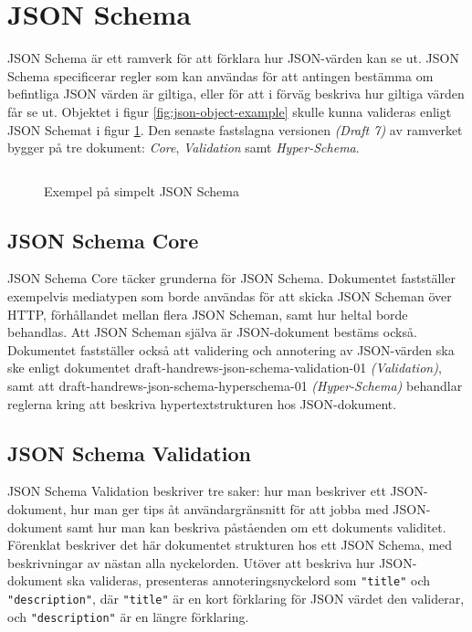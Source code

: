 \section{JSON Schema}
\label{sec:teori:schema}
JSON Schema är ett ramverk för att förklara hur JSON-värden kan se ut. JSON Schema specificerar regler som kan användas för att antingen bestämma om befintliga JSON värden är giltiga, eller för att i förväg beskriva hur giltiga värden får se ut. Objektet i figur \ref{fig:json-object-example} skulle kunna valideras enligt JSON Schemat i figur \ref{fig:json-schema-example}. Den senaste fastslagna versionen \textit{(Draft 7)} av ramverket bygger på tre dokument: \textit{Core}, \textit{Validation} samt \textit{Hyper-Schema}. \cite{A.Wright,Andrews2018,Andrews2018a}

\begin{figure}
	\inputminted[tabsize=2, frame=single, fontsize=\small, framesep=2mm]{json}{code/simple/schema.json}
	\vspace{-1.7em}
	\caption{Exempel på simpelt JSON Schema}
	\label{fig:json-schema-example}
\end{figure}

\subsection{JSON Schema Core}
JSON Schema Core täcker grunderna för JSON Schema. Dokumentet fastställer exempelvis mediatypen som borde användas för att skicka JSON Scheman över HTTP, förhållandet mellan flera JSON Scheman, samt hur heltal borde behandlas. Att JSON Scheman själva är JSON-dokument bestäms också. Dokumentet fastställer också att validering och annotering av JSON-värden ska ske enligt dokumentet draft-handrews-json-schema-validation-01 \textit{(Validation)}, samt att draft-handrews-json-schema-hyperschema-01 \textit{(Hyper-Schema)} behandlar reglerna kring att beskriva hypertextstrukturen hos JSON-dokument. \cite{A.Wright}

\subsection{JSON Schema Validation}
JSON Schema Validation beskriver tre saker: hur man beskriver ett JSON-dokument, hur man ger tips åt användargränsnitt för att jobba med JSON-dokument samt hur man kan beskriva påståenden om ett dokuments validitet. Förenklat beskriver det här dokumentet strukturen hos ett JSON Schema, med beskrivningar av nästan alla nyckelorden. Utöver att beskriva hur JSON-dokument ska valideras, presenteras annoteringsnyckelord som \texttt{"title"} och \texttt{"description"}, där \texttt{"title"} är en kort förklaring för JSON värdet den validerar, och \texttt{"description"} är en längre förklaring. \cite{Andrews2018}

